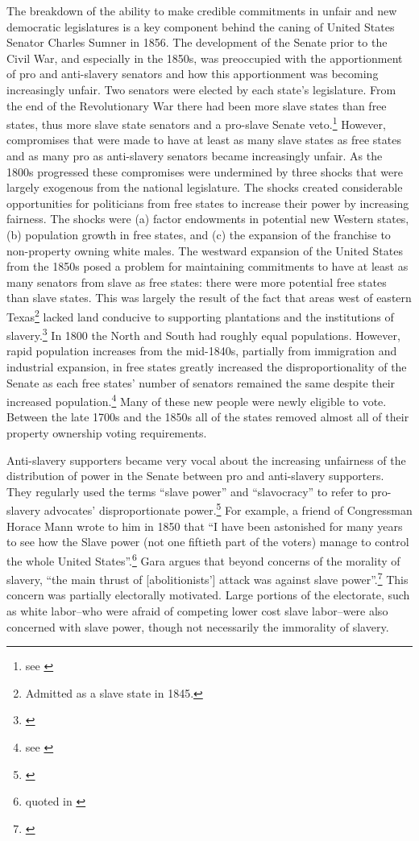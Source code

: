 \documentclass[a4paper]{article}\usepackage[]{graphicx}\usepackage[]{color}
\begin{document}
The breakdown of the ability to make credible commitments in unfair and new democratic legislatures is a key component behind the caning of United States Senator Charles Sumner in 1856. The development of the Senate prior to the Civil War, and especially in the 1850s, was preoccupied with the apportionment of pro and anti-slavery senators and how this apportionment was becoming increasingly unfair. Two senators were elected by each state's legislature. From the end of the Revolutionary War there had been more slave states than free states, thus more slave state senators and a pro-slave Senate veto.\footnote{see \citealt[151]{Weingast1998}} However, compromises that were made to have at least as many slave states as free states and as many pro as anti-slavery senators became increasingly unfair. As the 1800s progressed these compromises were undermined by three shocks that were largely exogenous from the national legislature. The shocks created considerable opportunities for politicians from free states to increase their power by increasing fairness. The shocks were (a) factor endowments in potential new Western states, (b) population growth in free states, and (c) the expansion of the franchise to non-property owning white males.  The westward expansion of the United States from the 1850s posed a problem for maintaining commitments to have at least as many senators from slave as free states: there were more potential free states than slave states. This was largely the result of the fact that areas west of eastern Texas\footnote{Admitted as a slave state in 1845.} lacked land conducive to supporting plantations and the institutions of slavery.\footnote{\citealt{Ramsdell1929,Weingast1998}} In 1800 the North and South had roughly equal populations. However, rapid population increases from the mid-1840s, partially from immigration and industrial expansion, in free states greatly increased the disproportionality of the Senate as each free states' number of senators remained the same despite their increased population.\footnote{see \citealt[184]{Weingast1998}} Many of these new people were newly eligible to vote. Between the late 1700s and the 1850s all of the states removed almost all of their property ownership voting requirements.

Anti-slavery supporters became very vocal about the increasing unfairness of the distribution of power in the Senate between pro and anti-slavery supporters. They regularly used the terms ``slave power'' and ``slavocracy'' to refer to pro-slavery advocates' disproportionate power.\footnote{\citealt{richards2000}} For example, a friend of Congressman Horace Mann wrote to him in 1850 that ``I have been astonished for many years to see how the Slave power (not one fiftieth part of the voters) manage to control the whole United States''.\footnote{quoted in \citealt[6]{Gara1969}} Gara argues that beyond concerns of the morality of slavery, ``the main thrust of [abolitionists'] attack was against slave power''.\footnote{\citealt[6]{Gara1969}} This concern was partially electorally motivated. Large portions of the electorate, such as white labor--who were afraid of competing lower cost slave labor--were also concerned with slave power, though not necessarily the immorality of slavery. 
\end{document}
